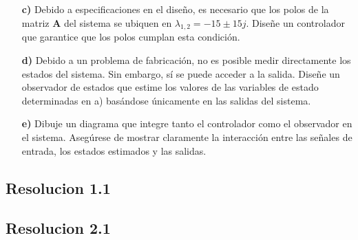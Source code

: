 \documentclass[
  11pt,
  letterpaper,
   addpoints,
  ]{exam}
\begin{document}
\begin{questions}
\begin{enumerate}
        \item[\textbf{c)}] Debido a especificaciones en el diseño, es necesario que los polos de la matriz \( \mathbf{A} \) del sistema se ubiquen en  \( \lambda_{1,2} = -15 \pm 15j \). Diseñe un controlador que garantice que los polos cumplan esta condición.
    
        \item[\textbf{d)}] Debido a un problema de fabricación, no es posible medir directamente los estados del sistema. Sin embargo, sí se puede acceder a la salida. Diseñe un observador de estados que estime los valores de las variables de estado determinadas en a) basándose únicamente en las salidas del sistema.
    
        \item[\textbf{e)}] Dibuje un diagrama que integre tanto el controlador como el observador en el sistema. Asegúrese de mostrar claramente la interacción entre las señales de entrada, los estados estimados y las salidas.
    \end{enumerate}
    \begin{solution}
        \subsection*{Resolucion 1.1}
    \end{solution}

    \begin{solution}
        \subsection*{Resolucion 2.1}
    \end{solution}

\end{questions}
\end{document}
